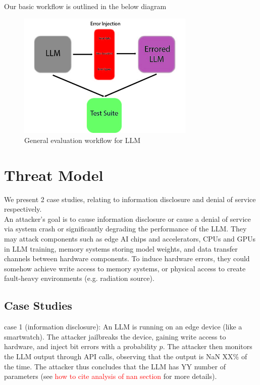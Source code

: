 \documentclass[a4paper]{article}
\begin{document}
Our basic workflow is outlined in the below diagram

\begin{figure}[ht]
	\begin{center}
		\includegraphics[height=6cm]{workflow.jpg}
		\caption{General evaluation workflow for LLM}
		\label{workflow}
	\end{center}
\end{figure}

\section{Threat Model}
We present 2 case studies, relating to information disclosure and denial of service respectively. \\

An attacker's goal is to cause information disclosure or cause a denial of service via system crash or significantly degrading the performance of the LLM. They may attack components such as edge AI chips and accelerators, CPUs and GPUs in LLM training, memory systems storing model weights, and data transfer channels between hardware components. To induce hardware errors, they could somehow achieve write access to memory systems, or physical access to create fault-heavy environments (e.g. radiation source). 

\subsection{Case Studies}
case 1 (information disclosure): An LLM is running on an edge device (like a smartwatch). The attacker jailbreaks the device, gaining write access to hardware, and inject bit errors with a probability $p$. The attacker then monitors the LLM output through API calls, observing that the output is NaN XX\% of the time. The attacker thus concludes that the LLM has YY number of parameters (see \textcolor{red}{how to cite analysis of nan section} for more details). \\
\end{document}
